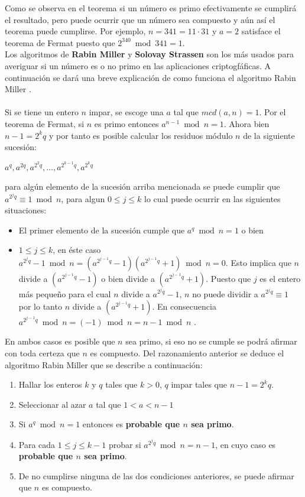 Como se observa en el teorema si un n\'umero es primo efectivamente se cumplir\'a el resultado, pero puede
ocurrir que un n\'umero sea compuesto y a\'un as\'i el teorema puede cumplirse. Por ejemplo, $n=341=11 \cdot 31 $ y $a=2$ satisface el teorema de Fermat puesto que 
$2^{340} \bmod 341 =1$.
\\
Los algoritmos de {\bf Rabin Miller} y {\bf Solovay Strassen} son los m\'as usados para averiguar si un n\'umero es o no primo en las aplicaciones criptogf\'aficas. A continuaci\'on se dar\'a
una breve explicaci\'on de como funciona el algoritmo Rabin Miller \cite{modes}.
\\
\\
Si se tiene un entero $n$ impar, se escoge una $a$ tal que $mcd(a, n)=1$. Por 
el teorema de Fermat, si $n$ es primo entonces $a^{n-1} \bmod n =1$. Ahora bien 
$n-1 = 2^kq$ y por tanto es posible calcular los residuos m\'odulo $n$ de la
siguiente sucesi\'on:
\begin{center}
$a^q, a^{2q}, a^{2^2q}, \ldots, a^{2^{k-1}q}, a^{2^kq}$
\end{center}
para  alg\'un elemento de la sucesi\'on arriba mencionada se puede cumplir que 
$a^{2^jq} \equiv 1 \bmod n$, para algun $0 \leq j \leq k$ lo cual puede ocurrir en las siguientes situaciones:
\begin{itemize}
 \item El primer elemento de la sucesi\'on cumple que $a^q \bmod n =1$ o bien 
 \item  $1 \leq j \leq k$, en \'este caso   $a^{2^jq} -1 \bmod n =
 (a^{2^{j-1}q} -1)(a^{2^{j-1}q} +1) \bmod n = 0$. Esto implica que $n$ divide a 
 $(a^{2^{j-1}q} -1)$ o bien divide a $(a^{2^{j-1}q} +1)$. Puesto que $j$ es el
 entero m\'as peque\~no para el cual $n$ divide a  $a^{2^jq}- 1$, $n$ no puede
 dividir a $a^{2^jq} \equiv 1$ por lo tanto $n$ divide a $(a^{2^{j-1}q} +1)$. En
 consecuencia $a^{2^{j-1}q} \bmod n = (-1) \bmod n = n-1 \bmod n$ .
\end{itemize}
En ambos casos es posible que $n$ sea primo, si eso no se cumple se podr\'a afirmar
con toda certeza que $n$ es compuesto. Del razonamiento anterior se deduce el 
algoritmo Rabin Miller que se describe a continuaci\'on:
\begin{enumerate}
 \item Hallar los enteros $k$ y $q$ tales que $k>0$, $q$ impar tales que $n-1=2^kq$.
 \item Seleccionar al azar $a$ tal que $1<a<n-1$
 \item Si $a^q \bmod n =1$ entonces es {\bf probable que $n$ sea primo}.
 \item Para cada $1 \leq j \leq k-1$ probar si $a^{2^jq}  \bmod n = n-1$, en cuyo
       caso es {\bf probable que $n$ sea primo}.
 \item De no cumplirse ninguna de las dos condiciones anteriores, se puede
      afirmar que $n$ es compuesto.      
\end{enumerate}


